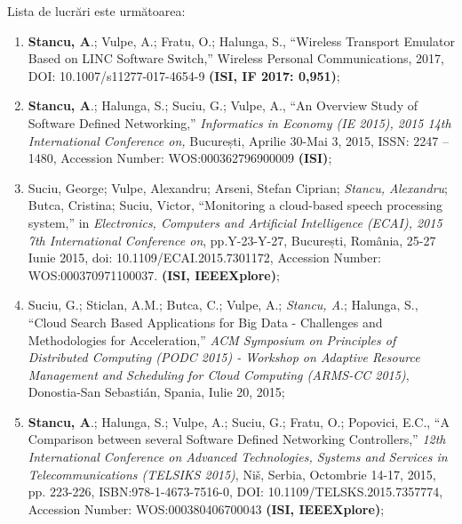 Lista de lucrări este următoarea:
\begin{enumerate}
	\item \textbf{Stancu, A}.; Vulpe, A.; Fratu, O.; Halunga, S., ``Wireless Transport Emulator Based on LINC Software Switch,'' Wireless Personal Communications, 2017, DOI: 10.1007/s11277-017-4654-9 \textbf{(ISI, IF 2017: 0,951)}\label{item:wte_linc};
	
	\item \textbf{Stancu, A}.; Halunga, S.; Suciu, G.; Vulpe, A., ``An Overview Study of Software Defined Networking,'' \textit{Informatics in Economy (IE 2015), 2015 14th International Conference on,} București, Aprilie 30-Mai 3, 2015, ISSN: 2247 – 1480, Accession Number: WOS:000362796900009 \textbf{(ISI)}\label{item:overview_sdn};
	
	\item Suciu, George; Vulpe, Alexandru; Arseni, Stefan Ciprian; \textit{Stancu, Alexandru}; Butca, Cristina; Suciu, Victor, ``Monitoring a cloud-based speech processing system,'' in \textit{Electronics, Computers and Artificial Intelligence (ECAI), 2015 7th International Conference on}, pp.Y-23-Y-27, București, România, 25-27 Iunie 2015, doi: 10.1109/ECAI.2015.7301172, Accession Number: WOS:000370971100037. \textbf{(ISI, IEEEXplore)};
	
	\item Suciu, G.; Sticlan, A.M.; Butca, C.; Vulpe, A.; \textit{Stancu, A}.; Halunga, S., ``Cloud Search Based Applications for Big Data - Challenges and Methodologies for Acceleration,'' \textit{ACM Symposium on Principles of Distributed Computing (PODC 2015) - Workshop on Adaptive Resource Management and Scheduling for Cloud Computing (ARMS-CC 2015)}, Donostia-San Sebastián, Spania, Iulie 20, 2015;
	
	\item \textbf{Stancu, A}.; Halunga, S.; Vulpe, A.; Suciu, G.; Fratu, O.; Popovici, E.C., ``A Comparison between several Software Defined Networking Controllers,'' \textit{12th International Conference on Advanced Technologies, Systems and Services in Telecommunications (TELSIKS 2015)}, Niš, Serbia, Octombrie 14-17, 2015, pp. 223-226, ISBN:978-1-4673-7516-0, DOI: 10.1109/TELSKS.2015.7357774, Accession Number: WOS:000380406700043 \textbf{(ISI, IEEEXplore)}\label{item:comparison_sdn};
	

\end{enumerate}
